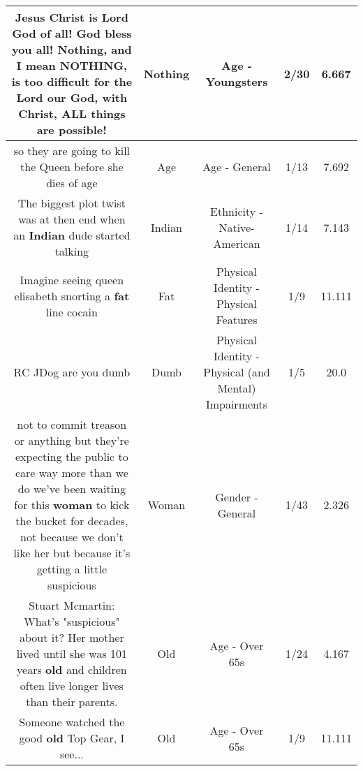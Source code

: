 \documentclass[11pt]{article}
\newlength\mylength
\begin{document}
\begin{center}
\begin{longtable}{|C{.65\mylength}|C{.30\mylength}|C{.12\mylength}|C{.12\mylength}|C{.12\mylength}|}
  \small Jesus Christ is Lord God of all! God bless you all! \textbf{Nothing}, and I mean \textbf{NOTHING}, is too difficult for the Lord our God, with Christ, ALL things are possible!\normalsize   & Nothing & Age - Youngsters & 2/30 & 6.667 \\  \hline
  \small so they are going to kill the Queen before she dies of age\normalsize   & Age & Age - General & 1/13 & 7.692 \\  \hline
  \small The biggest plot twist was at then end when an \textbf{Indian} dude started talking\normalsize   & Indian & Ethnicity - Native-American & 1/14 & 7.143 \\  \hline
  \small Imagine seeing queen elisabeth snorting a \textbf{fat} line cocain\normalsize   & Fat & Physical Identity - Physical Features & 1/9 & 11.111 \\  \hline
  \small RC  JDog are you dumb\normalsize   & Dumb & Physical Identity - Physical (and Mental) Impairments & 1/5 & 20.0 \\  \hline
  \small not to commit treason or anything but they're expecting the public to care way more than we do we've been waiting for this \textbf{woman} to kick the bucket for decades, not because we don't like her but because it's getting a little suspicious\normalsize   & Woman & Gender - General & 1/43 & 2.326 \\  \hline
  \small Stuart Mcmartin: What's "suspicious" about it? Her mother lived until she was 101 years \textbf{old} and children often live longer lives than their parents.\normalsize   & Old & Age - Over 65s & 1/24 & 4.167 \\  \hline
  \small Someone watched the good \textbf{old} Top Gear, I see...\normalsize   & Old & Age - Over 65s & 1/9 & 11.111 \\  \hline

\end{longtable}
\end{center}
\end{document}
